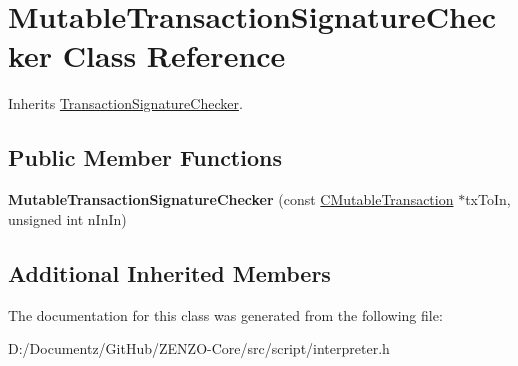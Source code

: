 \hypertarget{class_mutable_transaction_signature_checker}{}\section{Mutable\+Transaction\+Signature\+Checker Class Reference}
\label{class_mutable_transaction_signature_checker}


Inherits \mbox{\hyperlink{class_transaction_signature_checker}{Transaction\+Signature\+Checker}}.

\subsection*{Public Member Functions}
\begin{DoxyCompactItemize}
\item 
\mbox{\label{class_mutable_transaction_signature_checker_ac46799549e6eeebaff38cb1c9f5e1663}} 
{\bfseries Mutable\+Transaction\+Signature\+Checker} (const \mbox{\hyperlink{struct_c_mutable_transaction}{C\+Mutable\+Transaction}} $\ast$tx\+To\+In, unsigned int n\+In\+In)
\end{DoxyCompactItemize}
\subsection*{Additional Inherited Members}


The documentation for this class was generated from the following file\+:\begin{DoxyCompactItemize}
\item 
D\+:/\+Documentz/\+Git\+Hub/\+Z\+E\+N\+Z\+O-\/\+Core/src/script/interpreter.\+h\end{DoxyCompactItemize}

